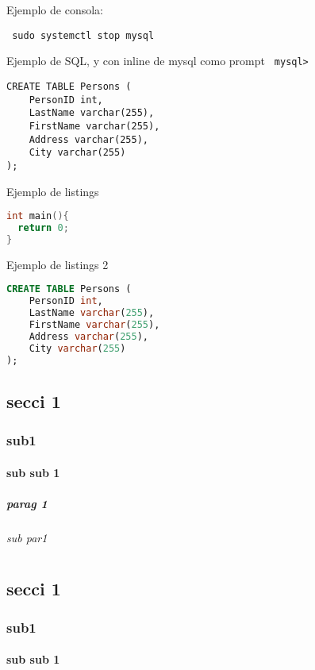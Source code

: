 \documentclass[12pt,a4paper,openany]{book}
\begin{document}
Ejemplo de consola: 	
\begin{verbatim}
 sudo systemctl stop mysql
\end{verbatim}

Ejemplo de SQL, y con inline de mysql como prompt \texttt{ mysql> }
\begin{verbatim}
CREATE TABLE Persons (
    PersonID int,
    LastName varchar(255),
    FirstName varchar(255),
    Address varchar(255),
    City varchar(255)
);
\end{verbatim}

Ejemplo de listings
\begin{lstlisting}[language={C}]
int main(){
  return 0;
}
\end{lstlisting}

Ejemplo de listings 2

\begin{lstlisting}[language={SQL}]
CREATE TABLE Persons (
    PersonID int,
    LastName varchar(255),
    FirstName varchar(255),
    Address varchar(255),
    City varchar(255)
);
\end{lstlisting}



\Blindtext[3]
\section{secci 1}
\Blindtext[3]
\subsection{sub1}
\Blindtext[3]
\subsubsection{sub sub 1}
\Blindtext[3]
\paragraph{parag 1}
\Blindtext[3]
\subparagraph{sub par1}
\Blindtext[3]

	





\chapter{}
\Blindtext[3]
\section{secci 1}
\Blindtext[3]
\subsection{sub1}
\Blindtext[3]
\subsubsection{sub sub 1}
\end{document}
